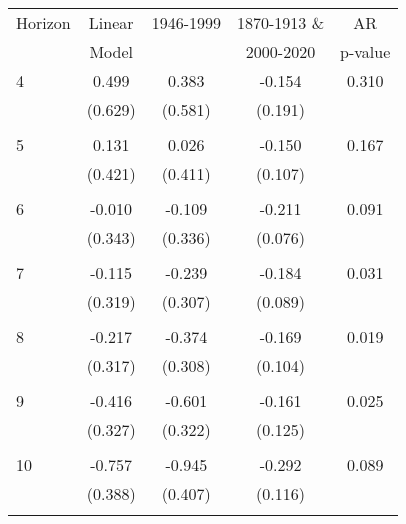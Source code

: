 \begin{tabular}{l*{1}{cccc}}
\hline\hline
 Horizon  & Linear & 1946-1999    & 1870-1913 \&   & AR            \\
          & Model  &              & 2000-2020      & p-value       \\
\hline
   4       & 0.499 & 0.383 & -0.154 & 0.310 \\
          & (0.629) & (0.581) & (0.191) & \\
 & & & &\\
   5       & 0.131 & 0.026 & -0.150 & 0.167 \\
          & (0.421) & (0.411) & (0.107) & \\
 & & & &\\
   6       & -0.010 & -0.109 & -0.211 & 0.091 \\
          & (0.343) & (0.336) & (0.076) & \\
 & & & &\\
   7       & -0.115 & -0.239 & -0.184 & 0.031 \\
          & (0.319) & (0.307) & (0.089) & \\
 & & & &\\
   8       & -0.217 & -0.374 & -0.169 & 0.019 \\
          & (0.317) & (0.308) & (0.104) & \\
 & & & &\\
   9       & -0.416 & -0.601 & -0.161 & 0.025 \\
          & (0.327) & (0.322) & (0.125) & \\
 & & & &\\
  10       & -0.757 & -0.945 & -0.292 & 0.089 \\
          & (0.388) & (0.407) & (0.116) & \\
 & & & &\\
\hline\hline
\end{tabular}
